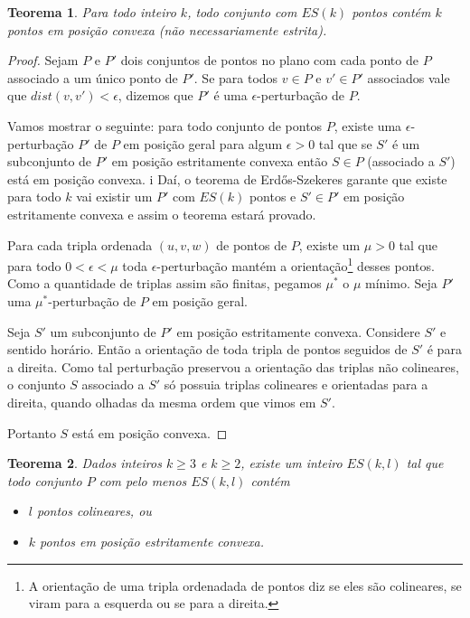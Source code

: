 \documentclass[a4paper]{book}
\newtheorem{teorema}{Teorema}
\begin{document}
\begin{teorema}\label{EScolinear}
    Para todo inteiro $k$, todo conjunto com $ES(k)$ pontos contém $k$ pontos em posição convexa (não necessariamente estrita).
\end{teorema}
\begin{proof}
    Sejam $P$ e $P'$ dois conjuntos de pontos no plano com cada ponto de $P$ associado a um único ponto de $P'$. Se para todos $v\in P$ e $v'\in P'$ associados vale que $dist(v,v')<\epsilon$, dizemos que $P'$ é uma $\epsilon$-perturbação de $P$.

    Vamos mostrar o seguinte: para todo conjunto de pontos $P$, existe uma $\epsilon$-perturbação $P'$ de $P$ em posição geral para algum $\epsilon>0$ tal que se $S'$ é um subconjunto de $P'$ em posição estritamente convexa então $S\in P$ (associado a $S'$) está em posição convexa.
i
    Daí, o teorema de Erd\H os-Szekeres garante que existe para todo $k$ vai existir um $P'$ com $ES(k)$ pontos e $S'\in P'$ em posição estritamente convexa e assim o teorema estará provado.
    
    Para cada tripla ordenada $(u,v,w)$ de pontos de $P$, existe um $\mu>0$ tal que para todo $0<\epsilon<\mu$ toda $\epsilon$-perturbação mantém a orientação\footnote{A orientação de uma tripla ordenadada de pontos diz se eles são colineares, se viram para a esquerda ou se para a direita.} desses pontos. Como a quantidade de triplas assim são finitas, pegamos $\mu^*$ o $\mu$ mínimo. Seja $P'$ uma $\mu^*$-perturbação de $P$ em posição geral.

    Seja $S'$ um subconjunto de $P'$ em posição estritamente convexa. Considere $S'$ e sentido horário. Então a orientação de toda tripla de pontos seguidos de $S'$ é para a direita. Como tal perturbação preservou a orientação das triplas não colineares, o conjunto $S$ associado a $S'$ só possuia triplas colineares e orientadas para a direita, quando olhadas da mesma ordem que vimos em $S'$.

    Portanto $S$ está em posição convexa.
\end{proof}
\begin{teorema}
    Dados inteiros $k\geq 3$ e $k\geq 2$, existe um inteiro $ES(k,l)$ tal que todo conjunto $P$ com pelo menos $ES(k,l)$ contém 
    \begin{itemize}
        \item $l$ pontos colineares, ou
        \item $k$ pontos em posição estritamente convexa.
    \end{itemize}
\end{teorema}
\end{document}
